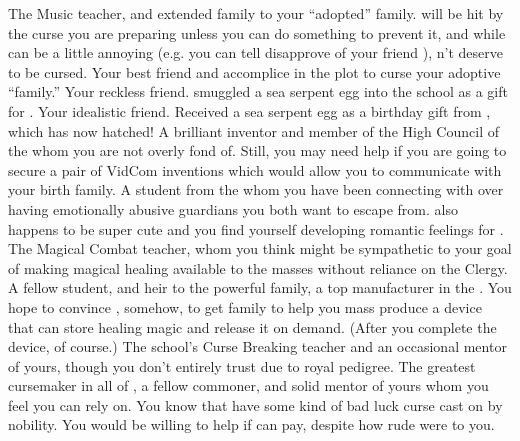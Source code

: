 \documentclass[char]{GL2020}
\begin{document}
\begin{contacts}
    \contact{\cMusic{}} The Music teacher, and extended family to your ``adopted'' family. \cMusic{\They} will be hit by the curse you are preparing unless you can do something to prevent it, and while \cMusic{} can be a little annoying (e.g. you can tell \cMusic{\they} disapprove of your friend \cLibAssist{}), \cMusic{\they} \cMusic{\do}n't deserve to be cursed.
    \contact{\cLibAssist{}} Your best friend and accomplice in the plot to curse your adoptive “family.”
    \contact{\cPirateChild{}} Your reckless \pShippie{} friend. \cPirateChild{\They} smuggled a sea serpent egg into the school as a gift for \cDisney{}.
    \contact{\cDisney{}} Your idealistic \cDisney{\cleric} friend. Received a sea serpent egg as a birthday gift from \cPirateChild{}, which has now hatched!
    \contact{\cTechStar{}} A brilliant inventor and member of the High Council of the \pTech{} whom you are not overly fond of. Still, you may need \cTechStar{\their} help if you are going to secure a pair of \cTechStar{\their} VidCom inventions which would allow you to communicate with your birth family. 
    \contact{\cScholarship{}} A student from the \pTech{} whom you have been connecting with over having emotionally abusive guardians you both want to escape from. \cScholarship{\They} also happens to be super cute and you find yourself developing romantic feelings for \cScholarship{\them}.
    \contact{\cInterpol{}} The Magical Combat teacher, whom you think might be sympathetic to your goal of making magical healing available to the masses without reliance on the Clergy.
    \contact{\cHeir{}} A fellow student, and heir to the powerful \cHeir{\formal} family, a top manufacturer in the \pTech{}. You hope to convince \cHeir{}, somehow, to get \cHeir{\their} family to help you mass produce a device that can store healing magic and release it on demand. (After you complete the device, of course.)
    \contact{\cPrince{}} The school's Curse Breaking teacher and an occasional mentor of yours, though you don't entirely trust \cPrince{\them} due to \cPrince{\their} royal pedigree. 
    \contact{\cCurse{}} The greatest cursemaker in all of \pEarth{}, a fellow commoner, and solid mentor of yours whom you feel you can rely on. 
    \contact {\cInitiate{}} You know that \cInitiate{\they} have some kind of bad luck curse cast on \cInitiate{\them} by \pFarm{} nobility. You would be willing to help if \cInitiate{\they} can pay, despite how rude \cInitiate{\they} were to you.
\end{contacts}
\end{document}
